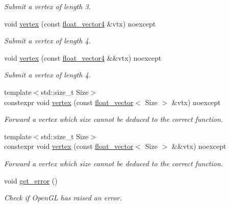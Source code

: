\begin{DoxyCompactItemize}
\begin{DoxyCompactList}\small\item\em Submit a vertex of length 3. \end{DoxyCompactList}\item 
void \hyperlink{namespaceglpp_a17db8234f91d9220706de37164127f26}{vertex} (const \hyperlink{namespaceglpp_ab4a3d7b8ed8e2e4810006eef5213a460}{float\+\_\+vector4} \&vtx) noexcept
\begin{DoxyCompactList}\small\item\em Submit a vertex of length 4. \end{DoxyCompactList}\item 
void \hyperlink{namespaceglpp_a7c8b5d363003996d111b08a87ee04d41}{vertex} (const \hyperlink{namespaceglpp_ab4a3d7b8ed8e2e4810006eef5213a460}{float\+\_\+vector4} \&\&vtx) noexcept
\begin{DoxyCompactList}\small\item\em Submit a vertex of length 4. \end{DoxyCompactList}\item 
{\footnotesize template$<$std\+::size\+\_\+t Size$>$ }\\constexpr void \hyperlink{namespaceglpp_a3ed8b91afc8b1771628e7e370d2a32d4}{vertex} (const \hyperlink{namespaceglpp_a6c618584338a9ebf15759cea2401f0ae}{float\+\_\+vector}$<$ Size $>$ \&vtx) noexcept
\begin{DoxyCompactList}\small\item\em Forward a vertex which size cannot be deduced to the correct function. \end{DoxyCompactList}\item 
{\footnotesize template$<$std\+::size\+\_\+t Size$>$ }\\constexpr void \hyperlink{namespaceglpp_ab0794adee60a65b05a53d3ebb884d7bb}{vertex} (const \hyperlink{namespaceglpp_a6c618584338a9ebf15759cea2401f0ae}{float\+\_\+vector}$<$ Size $>$ \&\&vtx) noexcept
\begin{DoxyCompactList}\small\item\em Forward a vertex which size cannot be deduced to the correct function. \end{DoxyCompactList}\item 
void \hyperlink{namespaceglpp_a40e9dba1fac476445cacac9d524fa623}{get\+\_\+error} ()
\begin{DoxyCompactList}\small\item\em Check if Open\+GL has raised an error. \end{DoxyCompactList}\item 

\end{DoxyCompactItemize}
